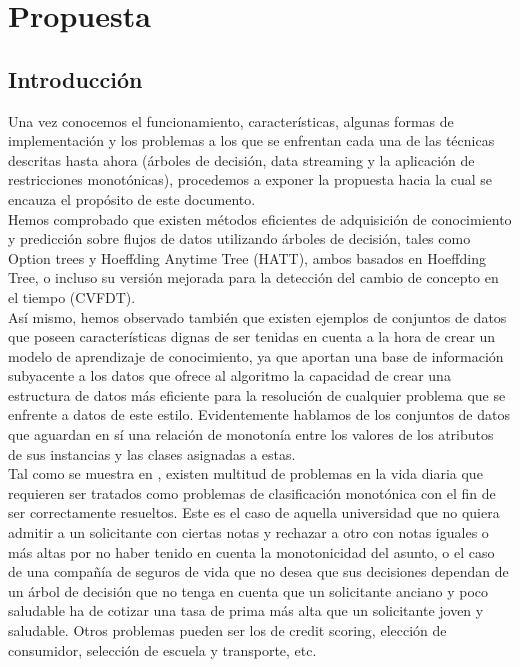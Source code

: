 \chapter[Capítulo 4. Propuesta]{Propuesta}

\section{Introducción}

Una vez conocemos el funcionamiento, características, algunas formas de implementación y los problemas a los que se enfrentan cada una de las técnicas descritas hasta ahora (árboles de decisión, data streaming y la aplicación de restricciones monotónicas), procedemos a exponer la propuesta hacia la cual se encauza el propósito de este documento.\\

Hemos comprobado que existen métodos eficientes de adquisición de conocimiento y predicción sobre flujos de datos utilizando árboles de decisión, tales como Option trees y Hoeffding Anytime Tree (HATT), ambos basados en Hoeffding Tree, o incluso su versión mejorada para la detección del cambio de concepto en el tiempo (CVFDT).\\

Así mismo, hemos observado también que existen ejemplos de conjuntos de datos que poseen características dignas de ser tenidas en cuenta a la hora de crear un modelo de aprendizaje de conocimiento, ya que aportan una base de información subyacente a los datos que ofrece al algoritmo la capacidad de crear una estructura de datos más eficiente para la resolución de cualquier problema que se enfrente a datos de este estilo. Evidentemente hablamos de los conjuntos de datos que aguardan en sí una relación de monotonía entre los valores de los atributos de sus instancias y las clases asignadas a estas.\\

Tal como se muestra en \cite{ref14}, existen multitud de problemas en la vida diaria que requieren ser tratados como problemas de clasificación monotónica con el fin de ser correctamente resueltos. Este es el caso de aquella universidad que no quiera admitir a un solicitante con ciertas notas y rechazar a otro con notas iguales o más altas por no haber tenido en cuenta la monotonicidad del asunto, o el caso de una compañía de seguros de vida que no desea que sus decisiones dependan de un árbol de decisión que no tenga en cuenta que un solicitante anciano y poco saludable ha de cotizar una tasa de prima más alta que un solicitante joven y saludable. Otros problemas pueden ser los de credit scoring, elección de consumidor, selección de escuela y transporte, etc.\\

